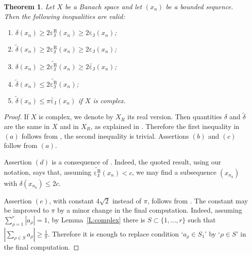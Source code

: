 \documentclass{amsart}
\numberwithin{equation}{section}
\newtheorem{thm}{Theorem}[section]
\theoremstyle{definition}
\def\wde#1{\widetilde{\delta}\left(#1\right)}
\def\de#1{\delta\left(#1\right)}
\def\cj#1{\operatorname{\varepsilon_J}\left(#1\right)}
\def\dcj#1{\widetilde{\operatorname{\varepsilon_J}}\left(#1\right)}
\def\cjr#1{\operatorname{\varepsilon_J^R}\left(#1\right)}
\def\dcjr#1{\widetilde{\operatorname{\varepsilon_J^R}}\left(#1\right)}
\newcommand{\abs}[1]{\left|#1\right|}
\begin{document}
\begin{thm}\label{T:rosenthal}
Let $X$ be a Banach space and let $(x_n)$ be a bounded sequence. Then the following inequalities are valid:
\begin{enumerate}[$(a)$]
    \item $\de{x_n}\ge2\cjr{x_n}\ge 2\cj{x_n}$;
    \item $\wde{x_n}\ge2\cjr{x_n}\ge 2\cj{x_n}$;
    \item $\de{x_n}\ge2\dcjr{x_n}\ge 2\dcj{x_n}$;
    \item $\wde{x_n}\le 2 \dcjr{x_n}$;
    \item  $\wde{x_n}\le \pi \dcj{x_n}$ if $X$ is complex.
\end{enumerate}
\end{thm}

\begin{proof}
If $X$ is complex, we denote by $X_R$ its real version. Then quantities $\delta$ and $\widetilde{\delta}$ are the same in $X$ and in $X_R$, as explained in \cite[Section 5]{wesecom}. Therefore the first inequality in $(a)$ follows from \cite[Lemma 5]{wesecom}, the second inequality is trivial. Assertions $(b)$ and $(c)$ follow from $(a)$.

Assertion $(d)$ is a consequence of \cite[Theorem 3.2]{behrends}. Indeed, the quoted result, using our notation, says that, assuming $\dcjr{x_n}<c$, we may find a subsequence $(x_{n_k})$ with $\de{x_{n_k}}\le 2c$.

Assertion $(e)$, with constant $4\sqrt2$ instead of $\pi$, follows from \cite[Theorem 3.3]{behrends}. 
The constant may be improved to $\pi$ by a minor change in the final computation. Indeed, assuming $\sum_{\rho=1}^r\abs{a_\rho}=1$, by Lemma~\ref{L:complex} there is $S\subset \{1,\dots,r\}$ such that $\abs{\sum_{\rho\in S} a_\rho}\ge\frac1\pi$. Therefore it is enough to replace condition `$a_\rho\in S_1$' by `$\rho\in S$' in the final computation.
\end{proof}
\end{document}
